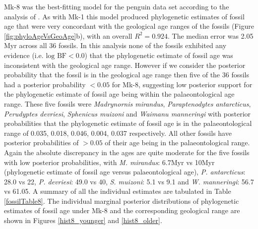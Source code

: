 \documentclass[11pt]{article}
\newcommand{\Mstrict}{{Mk-1}}
\newcommand{\Mrelaxed}{{Mk-8}}
\begin{document}
\Mrelaxed{} was the best-fitting model for the penguin data set according to the analysis of \cite{gavryushkina2015bayesian}. 
As with \Mstrict{} this model produced phylogenetic estimates of fossil age that were very concordant with the geological age ranges of the fossils (Figure \ref{fig:phyloAgeVsGeoAge}b), with an overall $R^2 = 0.924$. The median error was 2.05 Myr across all 36 fossils. 
In this analysis none of the fossils exhibited any evidence (i.e. $\text{log BF} < 0.0$) that the phylogenetic estimate of fossil age was inconsistent with the geological age range. 
However if we consider the posterior probability that the fossil is in the geological age range then five of the 36 fossils had a posterior probability $< 0.05$ for \Mrelaxed{}, suggesting low posterior support for the phylogenetic estimate of fossil age being within the palaeontological age range. 
These five fossils were {\em Madrynornis mirandus}, {\em Paraptenodytes antarcticus}, {\em Perudyptes devriesi}, {\em Sphenicus muizoni} and {\em Waimanu manneringi} with posterior probabilities that the phylogenetic estimate of fossil age is in the palaeontological range of 0.035, 0.018, 0.046, 0.004, 0.037 respectively. 
All other fossils have posterior probabilities of $> 0.05$ of their age being in the palaeontological range. 
Again the absolute discrepancy in the ages are quite moderate for the five fossils with low posterior probabilities, with {\em M. mirandus}: 6.7Myr vs 10Myr (phylogenetic estimate of fossil age versus palaeontological age), {\em P. antarcticus}: 28.0 vs 22, {\em P. devriesi}: 49.0 vs 40, {\em S. muizoni}: 5.1 vs 9.1 and {\em W. manneringi}: 56.7 vs 61.05. 
A summary of all the individual estimates are tabulated in Table \ref{fossilTable8}. 
The individual marginal posterior distributions of phylogenetic estimates of fossil age under \Mrelaxed{} and the corresponding geological range are shown in Figures \ref{hist8_younger} and \ref{hist8_older}.
\end{document}
